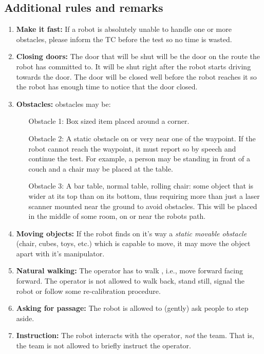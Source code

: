 \subsection{Additional rules and remarks}
\begin{enumerate}
	\item \textbf{Make it fast:} If a robot is absolutely unable to handle one or more obstacles, please inform the TC before the test so no time is wasted.
	\item \textbf{Closing doors:}  The door that will be shut will be the door on the route the robot has committed to. It will be shut right after the robot starts driving towards the door. The door will be closed well before the robot reaches it so the robot has enough time to notice that the door closed.
	\item \textbf{Obstacles:} obstacles may be:
	\begin{enumerate}
		\item [Obstacle 1:] Box sized item placed around a corner. 
		\item [Obstacle 2:] A static obstacle on or very near one of the waypoint. If the robot cannot reach the waypoint, it must report so by speech and continue the test. For example, a person may be standing in front of a couch and a chair may be placed at the table. 
		\item [Obstacle 3:] A bar table, normal table, rolling chair: some object that is wider at its top than on its bottom, thus requiring more than just a laser scanner mounted near the ground to avoid obstacles. This will be placed in the middle of some room, on or near the robots path.
	\end{enumerate}
	\item \textbf{Moving objects:} If the robot finds on it's way a \textit{static movable obstacle} (chair, cubes, toys, etc.) which is capable to move, it may move the object apart with it's manipulator.
	\item \textbf{Natural walking:} The operator has to walk , i.e., move forward facing forward. The operator is not allowed to walk back, stand still, signal the robot or follow some re-calibration procedure.
	\item \textbf{Asking for passage:} The robot is allowed to (gently) ask people to step aside.
	\item \textbf{Instruction:} The robot interacts with the operator, \emph{not} the team. That is, the team is not allowed to briefly instruct the operator.
\end{enumerate}

